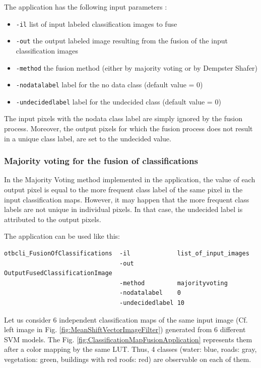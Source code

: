 The  application has the following input parameters :
\begin{itemize}
\item \verb?-il? list of input labeled classification images to fuse
\item \verb?-out? the output labeled image resulting from the fusion of the input classification images
\item \verb?-method? the fusion method (either by majority voting or by Dempster Shafer)
\item \verb?-nodatalabel? label for the no data class (default value = 0)
\item \verb?-undecidedlabel? label for the undecided class (default value = 0)
\end{itemize}


The input pixels with the nodata class label are simply ignored by the fusion process. 
Moreover, the output pixels for which the fusion process does not result in a unique 
class label, are set to the undecided value.

\subsubsection{Majority voting for the fusion of classifications}

In the Majority Voting method implemented in the  
application, the value of each output pixel is equal to the more frequent class 
label of the same pixel in the input classification maps. However, it may happen 
that the more frequent class labels are not unique in individual pixels. In that 
case, the undecided label is attributed to the output pixels.


The application can be used like this:
\begin{verbatim}
otbcli_FusionOfClassifications  -il             list_of_input_images
                                -out            OutputFusedClassificationImage
                                -method         majorityvoting
                                -nodatalabel    0
                                -undecidedlabel 10
\end{verbatim}


Let us consider 6 independent classification maps of the same input image (Cf. left 
image in Fig. \ref{fig:MeanShiftVectorImageFilter}) generated from 6 different SVM 
models. The Fig. \ref{fig:ClassificationMapFusionApplication} represents them after 
a color mapping by the same LUT. Thus, 4 classes (water: blue, roads: gray, 
vegetation: green, buildings with red roofs: red) are observable on each of them.


